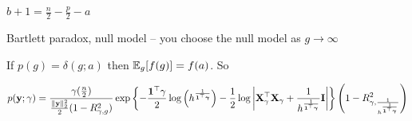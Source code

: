 \documentclass{amsart}
\begin{document}
$b + 1 = \frac{n}{2} - \frac{p}{2} - a$

Bartlett paradox, null model -- you choose the null model as $g \to \infty$

If $p(g) = \delta(g; a)$ then $\mathbb{E}_g[f(g)] = f(a)$. So

\begin{align*}
p({\bf y}; \gamma) = \frac{\gamma(\frac{n}{2})}{\frac{\|{\bf y}\|_2^2}{2}(1 - R_{\gamma, g}^2)}
									\exp\left \{ -\frac{{\bf 1}^\top \gamma}{2} \log \left ( h^{\frac{1}{{\bf 1}^\top {\boldsymbol\gamma}}} \right )
													- \frac{1}{2} \log\left |{\bf X}_\gamma^\top {\bf X}_\gamma + \frac{1}{h^{\frac{1}{{\bf 1}^\top {\boldsymbol\gamma}}}} {\bf I} \right | \right \} \left (1 - R_{\gamma, \frac{1}{h^{\frac{1}{{\bf 1}^\top {\boldsymbol\gamma}}}}}^2 \right )
\end{align*}
\end{document}
